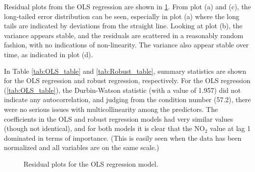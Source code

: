 \label{chapt:appendix_B}
Residual plots from the OLS regression are shown in \cref{fig:residuals_MLR}. From plot (a) and (c), the long-tailed error distribution can be seen, especially in plot (a) where the long tails are indicated by deviations from the straight line. Looking at plot (b), the variance appears stable, and the residuals are scattered in a reasonably random fashion, with no indications of non-linearity. The variance also appear stable over time, as indicated in plot (d). 

In Table \ref{tab:OLS_table} and \ref{tab:Robust_table}, summary statistics are shown for the OLS regression and robust regression, respectively. For the OLS regression (\cref{tab:OLS_table}), the Durbin-Watson statistic (with a value of 1.957) did not indicate any autocorrelation, and judging from the condition number (57.2), there were no serious issues with multicollinearity among the predictors. The coefficients in the OLS and robust regression models had very similar values (though not identical), and for both models it is clear that the NO$_2$ value at lag 1 dominated in terms of importance. (This is easily seen when the data has been normalized and all variables are on the same scale.) 

\begin{figure}[h]
\centering
{}
\caption{Residual plots for the OLS regression model.}
\label{fig:residuals_MLR}
\end{figure}

